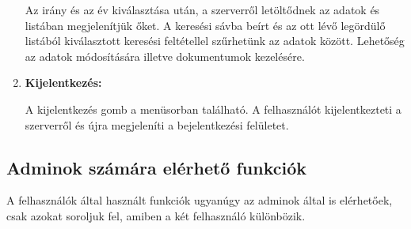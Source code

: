 \documentclass[
]{thesis-ekf}
\theoremstyle{definition}
\theoremstyle{remark}
\begin{document}
\begin{enumerate}[leftmargin=0pt]
Az irány és az év kiválasztása után, a szerverről letöltődnek az adatok és listában megjelenítjük őket. A keresési sávba beírt és az ott lévő legördülő listából kiválasztott keresési feltétellel szűrhetünk az adatok között. Lehetőség az adatok módosítására illetve dokumentumok kezelésére.
	\item \textbf{Kijelentkezés:}
	
A kijelentkezés gomb a menüsorban található. A felhasználót kijelentkezteti a szerverről és újra megjeleníti a bejelentkezési felületet.	
\end{enumerate}
\subsection{Adminok számára elérhető funkciók}
A felhasználók által használt funkciók ugyanúgy az adminok által is elérhetőek, csak azokat soroljuk fel, amiben a két felhasználó különbözik.
\end{document}
